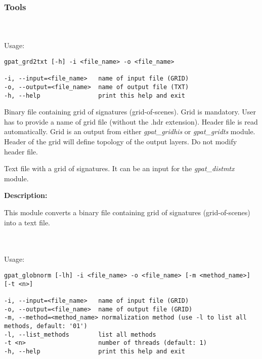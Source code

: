 \subsubsection{Tools}
{}
\\\\
Usage:

\begin{minipage}{\linewidth}
\begin{lstlisting}
gpat_grd2txt [-h] -i <file_name> -o <file_name>

-i, --input=<file_name>   name of input file (GRID)
-o, --output=<file_name>  name of output file (TXT)
-h, --help                print this help and exit
\end{lstlisting}
\end{minipage}


Binary file containing grid of signatures (grid-of-scenes). 
Grid is mandatory. 
User has to provide a name of grid file (without the .hdr extension). 
Header file is read automatically. 
Grid is an output from either {\it gpat\_gridhis} or {\it gpat\_gridts} module. 
Header of the grid will define topology of the output layers. 
Do not modify header file.


Text file with a grid of signatures. 
It can be an input for the {\it gpat\_distmtx} module.

{\bf Description:}

This module converts a binary file containing grid of signatures (grid-of-scenes) into a text file.

{}
\\\\
Usage:

\begin{minipage}{\linewidth}
\begin{lstlisting}
gpat_globnorm [-lh] -i <file_name> -o <file_name> [-m <method_name>] [-t <n>]

-i, --input=<file_name>   name of input file (GRID)
-o, --output=<file_name>  name of output file (GRID)
-m, --method=<method_name> normalization method (use -l to list all methods, default: '01')
-l, --list_methods        list all methods
-t <n>                    number of threads (default: 1)
-h, --help                print this help and exit
\end{lstlisting}
\end{minipage}

